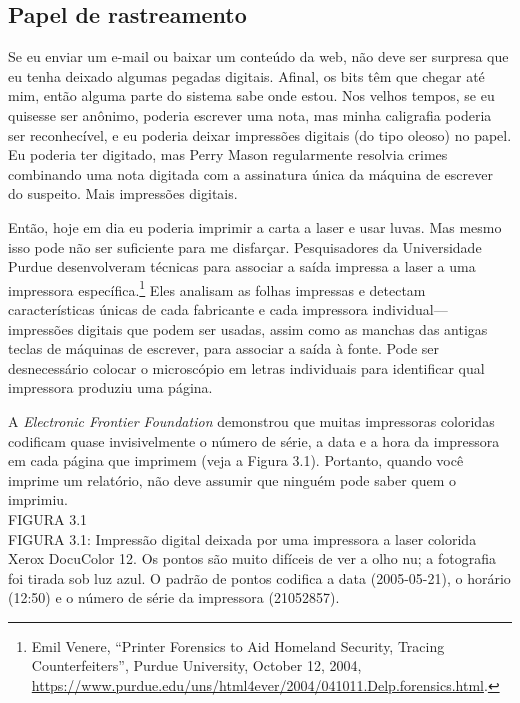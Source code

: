 \documentclass{book}
\newcommand{\ingles}[1]{\textit{#1}}
\begin{document}
\subsection{Papel de rastreamento}
\label{cap3:quem-pegadas-papel}
Se eu enviar um e-mail ou baixar um conteúdo da web, não deve ser surpresa que eu
tenha deixado algumas pegadas digitais. Afinal, os bits têm que chegar até mim,
então alguma parte do sistema sabe onde estou. Nos velhos tempos, se eu quisesse
ser anônimo, poderia escrever uma nota, mas minha caligrafia poderia ser reconhecível,
e eu poderia deixar impressões digitais (do tipo oleoso) no papel. Eu poderia ter
digitado, mas Perry Mason regularmente resolvia crimes combinando uma nota digitada
com a assinatura única da máquina de escrever do suspeito. Mais impressões digitais.

Então, hoje em dia eu poderia imprimir a carta a laser e usar luvas. Mas mesmo isso
pode não ser suficiente para me disfarçar. Pesquisadores da Universidade Purdue
desenvolveram técnicas para associar a saída impressa a laser a uma impressora
específica.\footnote{Emil Venere, ``Printer Forensics to Aid Homeland Security,
Tracing Counterfeiters'', Purdue University, October 12, 2004,
\url{https://www.purdue.edu/uns/html4ever/2004/041011.Delp.forensics.html}.}
Eles analisam as folhas impressas e detectam características únicas de
cada fabricante e cada impressora individual---impressões digitais que podem ser
usadas, assim como as manchas das antigas teclas de máquinas de escrever, para
associar a saída à fonte. Pode ser desnecessário colocar o microscópio em letras
individuais para identificar qual impressora produziu uma página.

A \ingles{Electronic Frontier Foundation} demonstrou que muitas impressoras
coloridas codificam quase invisivelmente o número de série, a data e a hora da
impressora em cada página que imprimem (veja a Figura 3.1). Portanto, quando
você imprime um relatório, não deve assumir que ninguém pode saber quem o imprimiu.\\

FIGURA 3.1\\

FIGURA 3.1: Impressão digital deixada por uma impressora a laser colorida Xerox
DocuColor 12. Os pontos são muito difíceis de ver a olho nu; a fotografia foi
tirada sob luz azul. O padrão de pontos codifica a data (2005-05-21), o horário
(12:50) e o número de série da impressora (21052857).
\end{document}
